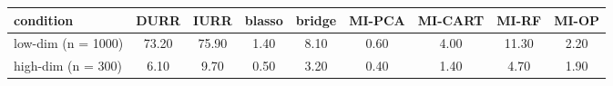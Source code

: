 \begin{table}
	{
	\begin{tabular}{l c c c c c c c c} 
		\toprule
		condition & DURR & IURR & blasso & bridge & MI-PCA & MI-CART & MI-RF & MI-OP \\
		\midrule
		low-dim (n = 1000) & 73.20 & 75.90 & 1.40 & 8.10 & 0.60 & 4.00 & 11.30 & 2.20 \\ 
		high-dim (n = 300) & 6.10 & 9.70 & 0.50 & 3.20 & 0.40 & 1.40 & 4.70 & 1.90 \\	
		\bottomrule
	\end{tabular}
	}
\label{tab:time}
\end{table}

\FloatBarrier


